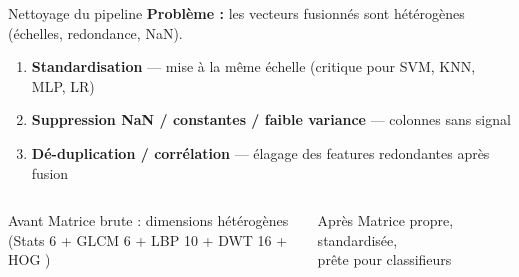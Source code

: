 \begin{frame}{Nettoyage du pipeline}
  \textbf{Problème :} les vecteurs fusionnés sont hétérogènes (échelles, redondance, NaN).
  \vspace{0.5em}

  \begin{enumerate}
    \item \textbf{Standardisation} --- mise à la même échelle (critique pour SVM, KNN, MLP, LR)
    \item \textbf{Suppression NaN / constantes / faible variance} --- colonnes sans signal
    \item \textbf{Dé-duplication / corrélation} --- élagage des features redondantes après fusion
  \end{enumerate}

  \vspace{0.6em}
  \begin{columns}[T]
    \begin{block}{Avant}
      Matrice brute : dimensions hétérogènes\\
      (Stats 6 + GLCM 6 + LBP 10 + DWT 16 + HOG \hogDim)
    \end{block}
    \begin{block}{Après}
      Matrice propre, standardisée,\\
      prête pour \NModels{} classifieurs
    \end{block}
  \end{columns}
\end{frame}

